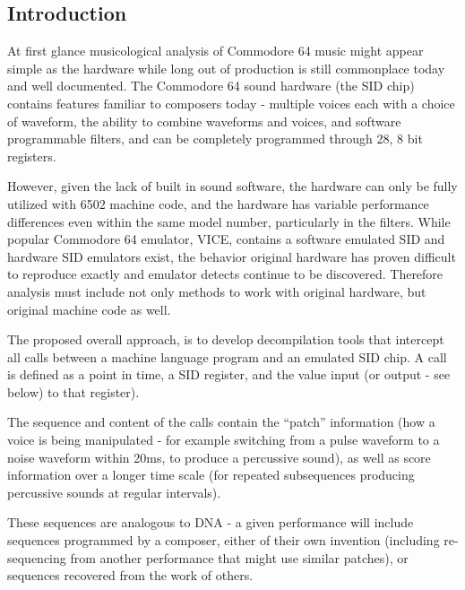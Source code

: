 \documentclass[10pt]{article}
\begin{document}
        \vspace{5mm}

\begin{multicols*}{2}

  \section{Introduction}

  At first glance musicological analysis of Commodore 64 music might
  appear simple as the hardware while long out of production is still
  commonplace today and well documented. The Commodore 64 sound
  hardware (the SID chip) contains features familiar to composers
  today - multiple voices each with a choice of waveform, the ability
  to combine waveforms and voices, and software programmable filters,
  and can be completely programmed through 28, 8 bit registers.

  However, given the lack of built in sound software, the hardware can
  only be fully utilized with 6502 machine code, and the hardware has
  variable performance differences even within the same model number,
  particularly in the filters. While popular Commodore 64 emulator,
  VICE, contains a software emulated SID and hardware SID emulators
  exist, the behavior original hardware has proven difficult to
  reproduce exactly and emulator detects continue to be discovered.
  Therefore analysis must include not only methods to work with
  original hardware, but original machine code as well.

  The proposed overall approach, is to develop decompilation tools
  that intercept all calls between a machine language program and an
  emulated SID chip. A call is defined as a point in time, a SID
  register, and the value input (or output - see below) to that
  register).

  The sequence and content of the calls contain the ``patch''
  information (how a voice is being manipulated - for example
  switching from a pulse waveform to a noise waveform within 20ms, to
  produce a percussive sound), as well as score information over a
  longer time scale (for repeated subsequences producing percussive
  sounds at regular intervals).

  These sequences are analogous to DNA - a given performance will
  include sequences programmed by a composer, either of their own
  invention (including re-sequencing from another performance that
  might use similar patches), or sequences recovered from the work of
  others.


\end{multicols*}
\end{document}
